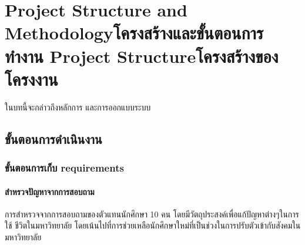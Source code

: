 \chapter{\ifproject%
\ifenglish Project Structure and Methodology\else โครงสร้างและขั้นตอนการทำงาน\fi
\else%
\ifenglish Project Structure\else โครงสร้างของโครงงาน\fi
\fi
}

ในบทนี้จะกล่าวถึงหลักการ และการออกแบบระบบ

\makeatletter


\makeatother

\section{ขั้นตอนการดําเนินงาน}

\subsection{ขั้นตอนการเก็บ requirements}
\subsubsection{สำหรวจปัญหาจากการสอบถาม}
การสําหรวจจากการสอบถามของตัวแทนนักศึกษา 10 คน โดยมีวัตถุประสงค์เพื่อแก้ปัญหาต่างๆในการใช้
ชีวิตในมหาวิทยาลัย โดยเน้นไปที่การช่วยเหลือนักศึกษาใหม่ที่เป็นช่วงในการปรับตัวเข้ากับสังคมในมหาวิทยาลัย

